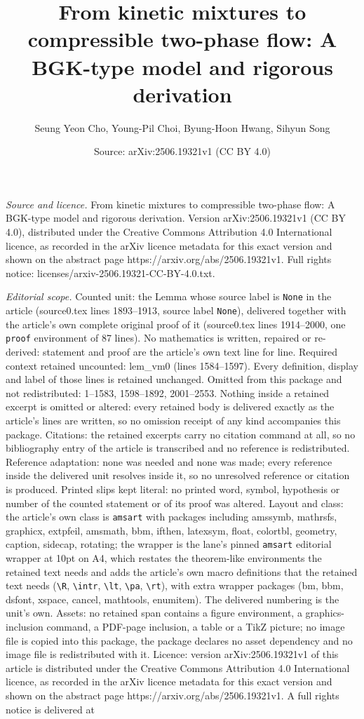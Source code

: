 \documentclass[10pt,a4paper]{amsart}
\title[From kinetic mixtures to compressible two-phase flow: A BGK-]{From kinetic mixtures to compressible two-phase flow: A BGK-type model and rigorous derivation}
\author{Seung Yeon Cho, Young-Pil Choi, Byung-Hoon Hwang, Sihyun Song}
\date{Source: arXiv:2506.19321v1 (CC BY 4.0)}
\begin{document}
\maketitle

\noindent\emph{Source and licence.} From kinetic mixtures to compressible two-phase flow: A BGK-type model and rigorous derivation. Version arXiv:2506.19321v1 (CC BY 4.0), distributed under the Creative Commons Attribution 4.0 International licence, as recorded in the arXiv licence metadata for this exact version and shown on the abstract page https://arxiv.org/abs/2506.19321v1. Full rights notice: licenses/arxiv-2506.19321-CC-BY-4.0.txt.\par\smallskip

\noindent\textit{Editorial scope.} Counted unit: the Lemma whose source label is \texttt{None} in the article (source0.tex lines 1893--1913, source label \texttt{None}), delivered together with the article's own complete original proof of it (source0.tex lines 1914--2000, one \texttt{proof} environment of 87 lines). No mathematics is written, repaired or re-derived: statement and proof are the article's own text line for line. Required context retained uncounted: lem\_vm0 (lines 1584--1597). Every definition, display and label of those lines is retained unchanged. Omitted from this package and not redistributed: 1--1583, 1598--1892, 2001--2553. Nothing inside a retained excerpt is omitted or altered: every retained body is delivered exactly as the article's lines are written, so no omission receipt of any kind accompanies this package. Citations: the retained excerpts carry no citation command at all, so no bibliography entry of the article is transcribed and no reference is redistributed. Reference adaptation: none was needed and none was made; every reference inside the delivered unit resolves inside it, so no unresolved reference or citation is produced. Printed slips kept literal: no printed word, symbol, hypothesis or number of the counted statement or of its proof was altered. Layout and class: the article's own class is \texttt{amsart} with packages including amssymb, mathrsfs, graphicx, extpfeil, amsmath, bbm, ifthen, latexsym, float, colortbl, geometry, caption, sidecap, rotating; the wrapper is the lane's pinned \texttt{amsart} editorial wrapper at 10pt on A4, which restates the theorem-like environments the retained text needs and adds the article's own macro definitions that the retained text needs (\texttt{\textbackslash R}, \texttt{\textbackslash intr}, \texttt{\textbackslash lt}, \texttt{\textbackslash pa}, \texttt{\textbackslash rt}), with extra wrapper packages (bm, bbm, dsfont, xspace, cancel, mathtools, enumitem). The delivered numbering is the unit's own. Assets: no retained span contains a figure environment, a graphics-inclusion command, a PDF-page inclusion, a table or a TikZ picture; no image file is copied into this package, the package declares no asset dependency and no image file is redistributed with it. Licence: version arXiv:2506.19321v1 of this article is distributed under the Creative Commons Attribution 4.0 International licence, as recorded in the arXiv licence metadata for this exact version and shown on the abstract page https://arxiv.org/abs/2506.19321v1. A full rights notice is delivered at 
\end{document}
